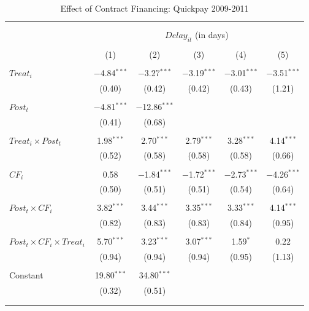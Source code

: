 \documentclass[]{article}
\begin{document}
\begin{table}[H] \centering 
  \caption{Effect of Contract Financing: Quickpay 2009-2011} 
  \label{} 
\small 
\begin{tabular}{@{\extracolsep{-2pt}}lccccc} 
\\[-1.8ex]\hline 
\hline \\[-1.8ex] 
\\[-1.8ex] & \multicolumn{5}{c}{$Delay_{it}$ (in days)} \\ 
\\[-1.8ex] & (1) & (2) & (3) & (4) & (5)\\ 
\hline \\[-1.8ex] 
 $Treat_i$ & $-$4.84$^{***}$ & $-$3.27$^{***}$ & $-$3.19$^{***}$ & $-$3.01$^{***}$ & $-$3.51$^{***}$ \\ 
  & (0.40) & (0.42) & (0.42) & (0.43) & (1.21) \\ 
  & & & & & \\ 
 $Post_t$ & $-$4.81$^{***}$ & $-$12.86$^{***}$ &  &  &  \\ 
  & (0.41) & (0.68) &  &  &  \\ 
  & & & & & \\ 
 $Treat_i \times Post_t$ & 1.98$^{***}$ & 2.70$^{***}$ & 2.79$^{***}$ & 3.28$^{***}$ & 4.14$^{***}$ \\ 
  & (0.52) & (0.58) & (0.58) & (0.58) & (0.66) \\ 
  & & & & & \\ 
 $CF_i$ & 0.58 & $-$1.84$^{***}$ & $-$1.72$^{***}$ & $-$2.73$^{***}$ & $-$4.26$^{***}$ \\ 
  & (0.50) & (0.51) & (0.51) & (0.54) & (0.64) \\ 
  & & & & & \\ 
 $Post_t \times CF_i$ & 3.82$^{***}$ & 3.44$^{***}$ & 3.35$^{***}$ & 3.33$^{***}$ & 4.14$^{***}$ \\ 
  & (0.82) & (0.83) & (0.83) & (0.84) & (0.95) \\ 
  & & & & & \\ 
 $Post_t \times CF_i \times Treat_i$ & 5.70$^{***}$ & 3.23$^{***}$ & 3.07$^{***}$ & 1.59$^{*}$ & 0.22 \\ 
  & (0.94) & (0.94) & (0.94) & (0.95) & (1.13) \\ 
  & & & & & \\ 
 Constant & 19.80$^{***}$ & 34.80$^{***}$ &  &  &  \\ 
  & (0.32) & (0.51) &  &  &  \\ 
  & & & & & \\ 
\hline \\[-1.8ex] 

\end{tabular}
\end{table}
\end{document}
